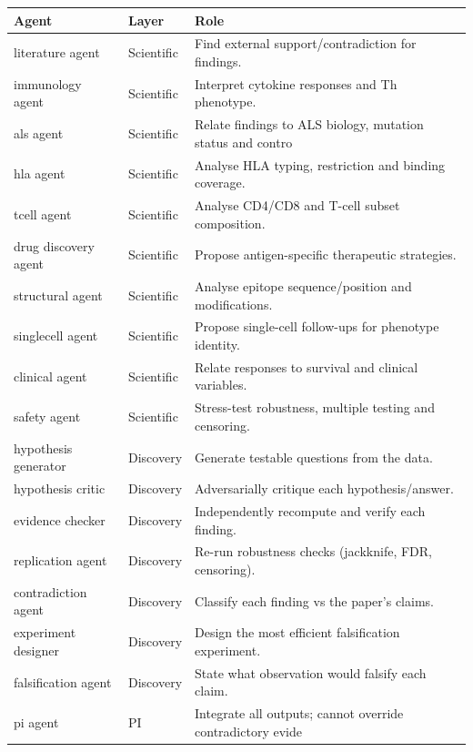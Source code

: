 \begin{tabular}{p{3.6cm}lp{7.6cm}}
\toprule
Agent & Layer & Role \\
\midrule
literature agent & Scientific & Find external support/contradiction for findings. \\
immunology agent & Scientific & Interpret cytokine responses and Th phenotype. \\
als agent & Scientific & Relate findings to ALS biology, mutation status and contro \\
hla agent & Scientific & Analyse HLA typing, restriction and binding coverage. \\
tcell agent & Scientific & Analyse CD4/CD8 and T-cell subset composition. \\
drug discovery agent & Scientific & Propose antigen-specific therapeutic strategies. \\
structural agent & Scientific & Analyse epitope sequence/position and modifications. \\
singlecell agent & Scientific & Propose single-cell follow-ups for phenotype identity. \\
clinical agent & Scientific & Relate responses to survival and clinical variables. \\
safety agent & Scientific & Stress-test robustness, multiple testing and censoring. \\
hypothesis generator & Discovery & Generate testable questions from the data. \\
hypothesis critic & Discovery & Adversarially critique each hypothesis/answer. \\
evidence checker & Discovery & Independently recompute and verify each finding. \\
replication agent & Discovery & Re-run robustness checks (jackknife, FDR, censoring). \\
contradiction agent & Discovery & Classify each finding vs the paper's claims. \\
experiment designer & Discovery & Design the most efficient falsification experiment. \\
falsification agent & Discovery & State what observation would falsify each claim. \\
pi agent & PI & Integrate all outputs; cannot override contradictory evide \\
\bottomrule
\end{tabular}

